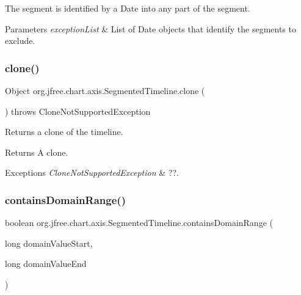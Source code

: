 The segment is identified by a Date into any part of the segment.


\begin{DoxyParams}{Parameters}
{\em exception\+List} & List of Date objects that identify the segments to exclude. \\
\hline
\end{DoxyParams}
\mbox{\label{classorg_1_1jfree_1_1chart_1_1axis_1_1_segmented_timeline_ae65d1e1c8a1bb47827154b1702772ff5}} 
\subsubsection{\texorpdfstring{clone()}{clone()}}
{\footnotesize\ttfamily Object org.\+jfree.\+chart.\+axis.\+Segmented\+Timeline.\+clone (\begin{DoxyParamCaption}{ }\end{DoxyParamCaption}) throws Clone\+Not\+Supported\+Exception}

Returns a clone of the timeline.

\begin{DoxyReturn}{Returns}
A clone.
\end{DoxyReturn}

\begin{DoxyExceptions}{Exceptions}
{\em Clone\+Not\+Supported\+Exception} & ??. \\
\hline
\end{DoxyExceptions}
\mbox{\label{classorg_1_1jfree_1_1chart_1_1axis_1_1_segmented_timeline_afd857a016b41d3169350c0e506382f6e}} 
\subsubsection{\texorpdfstring{contains\+Domain\+Range()}{containsDomainRange()}\hspace{0.1cm}{\footnotesize\ttfamily [1/2]}}
{\footnotesize\ttfamily boolean org.\+jfree.\+chart.\+axis.\+Segmented\+Timeline.\+contains\+Domain\+Range (\begin{DoxyParamCaption}\item[{long}]{domain\+Value\+Start,  }\item[{long}]{domain\+Value\+End }\end{DoxyParamCaption})}

